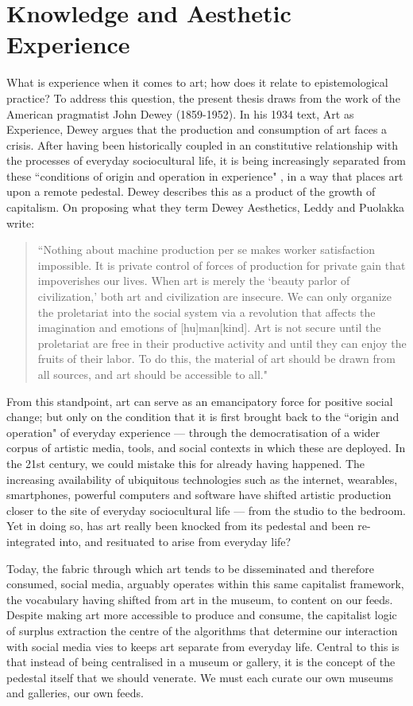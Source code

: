 \section{Knowledge and Aesthetic Experience}\label{sec: theory-experience}
What is experience when it comes to art; how does it relate to epistemological practice? To address this question, the present thesis draws from the work of the American pragmatist John Dewey (1859-1952). In his 1934 text, Art as Experience, Dewey argues that the production and consumption of art faces a crisis. After having been historically coupled in an constitutive relationship with the processes of everyday sociocultural life, it is being increasingly separated from these ``conditions of origin and operation in experience" \citep{dewey1934}, in a way that places art upon a remote pedestal. Dewey describes this as a product of the growth of capitalism. On proposing what they term Dewey Aesthetics, Leddy and Puolakka write:
\begin{quote}
    ``Nothing about machine production per se makes worker satisfaction impossible. It is private control of forces of production for private gain that impoverishes our lives. When art is merely the `beauty parlor of civilization,' both art and civilization are insecure. We can only organize the proletariat into the social system via a revolution that affects the imagination and emotions of [hu]man[kind]. Art is not secure until the proletariat are free in their productive activity and until they can enjoy the fruits of their labor. To do this, the material of art should be drawn from all sources, and art should be accessible to all." \citep{leddy2021}
\end{quote}
From this standpoint, art can serve as an emancipatory force for positive social change; but only on the condition that it is first brought back to the ``origin and operation" of everyday experience — through the democratisation of a wider corpus of artistic media, tools, and social contexts in which these are deployed. In the 21st century, we could mistake this for already having happened. The increasing availability of ubiquitous technologies such as the internet, wearables, smartphones, powerful computers and software have shifted artistic production closer to the site of everyday sociocultural life — from the studio to the bedroom. Yet in doing so, has art really been knocked from its pedestal and been re-integrated into, and resituated to arise from everyday life? 

Today, the fabric through which art tends to be disseminated and therefore consumed, social media, arguably operates within this same capitalist framework, the vocabulary having shifted from art in the museum, to content on our feeds. Despite making art more accessible to produce and consume, the capitalist logic of surplus extraction the centre of the algorithms that determine our interaction with social media vies to keeps art separate from everyday life. Central to this is that instead of being centralised in a museum or gallery, it is the concept of the pedestal itself that we should venerate. We must each curate our own museums and galleries, our own feeds.

